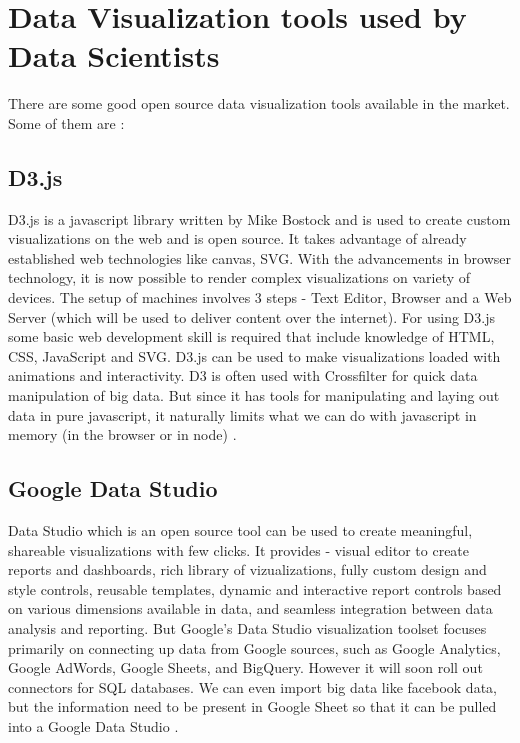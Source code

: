 \section{Data Visualization tools used by Data Scientists}

There are some good open source data visualization tools available in the market. Some of them are :

\subsection{D3.js}

D3.js is a javascript library written by Mike Bostock and is used to create custom visualizations on the web and is open source. It takes advantage of already established web technologies like canvas, SVG. With the advancements in browser technology, it is now possible to render complex visualizations on variety of devices. The setup of machines involves 3 steps - Text Editor, Browser and a Web Server (which will be used to deliver content over the internet). For using D3.js some basic web development skill is required that include knowledge of HTML, CSS, JavaScript and SVG.
D3.js can be used to make visualizations loaded with animations and interactivity. D3 is often used with Crossfilter for quick data manipulation of big data. But since it has tools for manipulating and laying out data in pure javascript, it naturally limits what we can do with javascript in memory (in the browser or in node) \cite{D3}.\\


\subsection{Google Data Studio}

Data Studio which is an open source tool can be used to create meaningful, shareable visualizations with few clicks. It provides - visual editor to create reports and dashboards, rich library of vizualizations, fully custom design and style controls, reusable templates, dynamic and interactive report controls based on various dimensions available in data, and seamless integration between data analysis and reporting. But Google's Data Studio visualization toolset focuses primarily on connecting up data from Google sources, such as Google Analytics, Google AdWords, Google Sheets, and BigQuery. However it will soon roll out connectors for SQL databases. We can even import big data like facebook data, but the information need to be present in Google Sheet so that it can be pulled into a Google Data Studio \cite{Google}. \\

